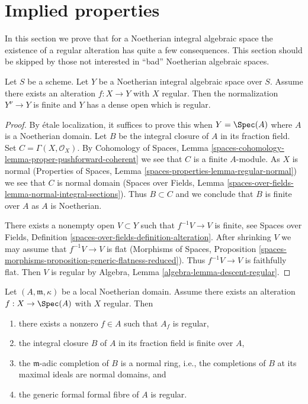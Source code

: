 \section{Implied properties}
\label{section-existence-gives}

\noindent
In this section we prove that for a Noetherian integral algebraic space
the existence of a regular alteration has quite a few consequences.
This section should be skipped by those not interested in ``bad''
Noetherian algebraic spaces.

\begin{lemma}
\label{lemma-regular-alteration-implies}
Let $S$ be a scheme. Let $Y$ be a Noetherian integral algebraic space
over $S$. Assume there exists an alteration
$f : X \to Y$ with $X$ regular. Then the normalization $Y^\nu \to Y$
is finite and $Y$ has a dense open which is regular.
\end{lemma}

\begin{proof}
By \'etale localization, it suffices to prove this when
$Y = \Spec(A)$ where $A$ is a Noetherian domain.
Let $B$ be the integral closure of $A$ in its fraction field.
Set $C = \Gamma(X, \mathcal{O}_X)$. By
Cohomology of Spaces, Lemma
\ref{spaces-cohomology-lemma-proper-pushforward-coherent}
we see that $C$ is a finite $A$-module.
As $X$ is normal
(Properties of Spaces, Lemma
\ref{spaces-properties-lemma-regular-normal})
we see that $C$ is normal domain
(Spaces over Fields, Lemma
\ref{spaces-over-fields-lemma-normal-integral-sections}).
Thus $B \subset C$ and we conclude that $B$ is finite over $A$
as $A$ is Noetherian.

\medskip\noindent
There exists a nonempty open $V \subset Y$ such that $f^{-1}V \to V$
is finite, see Spaces over Fields, Definition
\ref{spaces-over-fields-definition-alteration}.
After shrinking $V$ we may assume that $f^{-1}V \to V$ is flat
(Morphisms of Spaces, Proposition
\ref{spaces-morphisms-proposition-generic-flatness-reduced}).
Thus $f^{-1}V \to V$ is faithfully flat. Then $V$ is regular by
Algebra, Lemma \ref{algebra-lemma-descent-regular}.
\end{proof}

\begin{lemma}
\label{lemma-regular-alteration-implies-local}
Let $(A, \mathfrak m, \kappa)$ be a local Noetherian domain.
Assume there exists an alteration $f : X \to \Spec(A)$
with $X$ regular. Then
\begin{enumerate}
\item there exists a nonzero $f \in A$ such that $A_f$ is regular,
\item the integral closure $B$ of $A$ in its fraction field is finite over $A$,
\item the $\mathfrak m$-adic completion of $B$ is a normal ring, i.e., the
completions of $B$ at its maximal ideals are normal domains, and
\item the generic formal formal fibre of $A$ is regular.
\end{enumerate}
\end{lemma}

